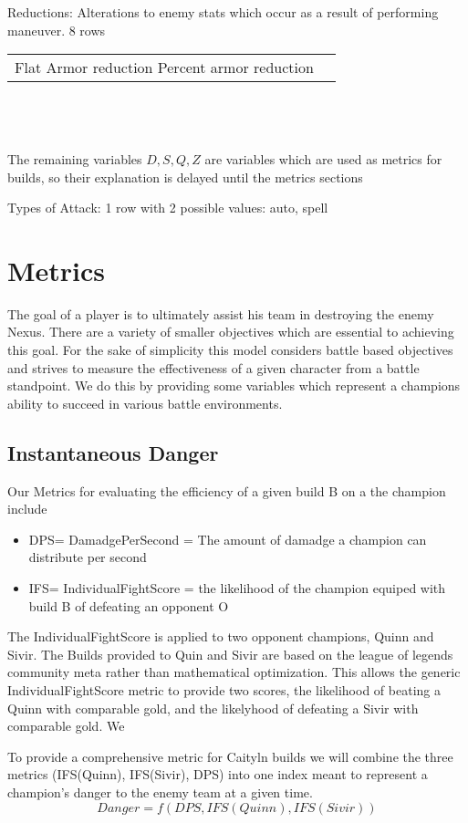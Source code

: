 \documentclass{article}
\begin{document}
Reductions: Alterations to enemy stats which occur as a result of performing maneuver.  8 rows
\begin{tabular}{cc}
Flat Armor reduction
Percent armor reduction
\end{tabular} \\\\\\
The remaining variables $D,S,Q,Z$ are variables which are used as metrics for builds, so their explanation is delayed until the metrics sections

Types of Attack: 1 row with 2 possible values: auto, spell   
\newpage

\section{Metrics}
The goal of a player is to ultimately assist his team in destroying the enemy Nexus.  There are a variety of smaller objectives which are essential to achieving this goal.  For the sake of simplicity this model considers battle based objectives and strives to  measure the effectiveness of a given character from a battle standpoint.  We do this by providing some variables which represent a champions ability to succeed in various battle environments.
\subsection{Instantaneous Danger}
 Our Metrics for evaluating the efficiency of a given build B on a the champion  include\\
\begin{itemize}
	\item  DPS=  DamadgePerSecond = The amount of damadge a champion can distribute per second 
	\item  IFS= IndividualFightScore = the likelihood of the champion equiped with build B of defeating an opponent O
\end{itemize}
The IndividualFightScore is applied to two opponent champions, Quinn and Sivir.  The Builds provided to Quin and Sivir are based on the league of legends community meta rather than mathematical optimization.  This allows the generic IndividualFightScore metric to provide two scores, the likelihood of beating a Quinn with comparable gold, and the likelyhood of defeating a Sivir with comparable gold.  We


To provide a comprehensive metric for Caityln builds we will combine the three metrics (IFS(Quinn), IFS(Sivir), DPS) into one index meant to represent a champion's danger to the enemy team at a given time.  
\begin{equation}
Danger = f(DPS, IFS(Quinn), IFS(Sivir))
\end{equation}
\end{document}
